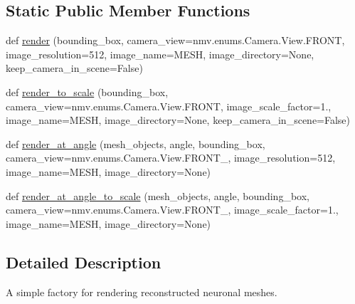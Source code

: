 \subsection*{Static Public Member Functions}
\begin{DoxyCompactItemize}
\item 
def \hyperlink{classmeshy_1_1neuromorphovis_1_1rendering_1_1renderes_1_1mesh__renderer_1_1NeuronMeshRenderer_ac62b37b90a808fac9914a0f4180d0a4c}{render} (bounding\+\_\+box, camera\+\_\+view=nmv.\+enums.\+Camera.\+View.\+F\+R\+O\+NT, image\+\_\+resolution=512, image\+\_\+name=\textquotesingle{}M\+E\+SH\textquotesingle{}, image\+\_\+directory=None, keep\+\_\+camera\+\_\+in\+\_\+scene=False)
\item 
def \hyperlink{classmeshy_1_1neuromorphovis_1_1rendering_1_1renderes_1_1mesh__renderer_1_1NeuronMeshRenderer_a9fa76605a667bac7c7f6c716d4c6d4bb}{render\+\_\+to\+\_\+scale} (bounding\+\_\+box, camera\+\_\+view=nmv.\+enums.\+Camera.\+View.\+F\+R\+O\+NT, image\+\_\+scale\+\_\+factor=1., image\+\_\+name=\textquotesingle{}M\+E\+SH\textquotesingle{}, image\+\_\+directory=None, keep\+\_\+camera\+\_\+in\+\_\+scene=False)
\item 
def \hyperlink{classmeshy_1_1neuromorphovis_1_1rendering_1_1renderes_1_1mesh__renderer_1_1NeuronMeshRenderer_af576a900455fc36469353c746a388fec}{render\+\_\+at\+\_\+angle} (mesh\+\_\+objects, angle, bounding\+\_\+box, camera\+\_\+view=nmv.\+enums.\+Camera.\+View.\+F\+R\+O\+N\+T\+\_, image\+\_\+resolution=512, image\+\_\+name=\textquotesingle{}M\+E\+SH\textquotesingle{}, image\+\_\+directory=None)
\item 
def \hyperlink{classmeshy_1_1neuromorphovis_1_1rendering_1_1renderes_1_1mesh__renderer_1_1NeuronMeshRenderer_a91cd88320e7d395c445afb9eb6750d71}{render\+\_\+at\+\_\+angle\+\_\+to\+\_\+scale} (mesh\+\_\+objects, angle, bounding\+\_\+box, camera\+\_\+view=nmv.\+enums.\+Camera.\+View.\+F\+R\+O\+N\+T\+\_, image\+\_\+scale\+\_\+factor=1., image\+\_\+name=\textquotesingle{}M\+E\+SH\textquotesingle{}, image\+\_\+directory=None)
\end{DoxyCompactItemize}


\subsection{Detailed Description}


\begin{DoxyVerb}A simple factory for rendering reconstructed neuronal meshes.\end{DoxyVerb}
 

